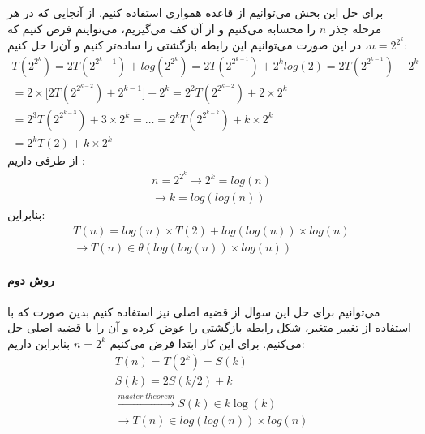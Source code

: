 \documentclass[]{article}
\begin{document}
برای حل این بخش می‌توانیم از قاعده همواری استفاده کنیم. از آنجایی که در هر مرحله جذر $n$
را محسابه می‌کنیم و از آن کف می‌گیریم، می‌تواینم فرض کنیم که $n = 2^{2^k}$،
در این صورت می‌توانیم این رابطه بازگشتی را ساده‌تر کنیم و آن‌را حل کنیم:
\begin{align}
    T(2^{2^k}) = 2T(2^{2^k-1}) + log(2^{2^k}) = 2T(2^{2^{k-1}}) + 2^k log(2) = 2T(2^{2^{k-1}}) + 2^k \\
    = 2 \times \lbrack 2T(2^{2^{k-2}}) + 2^{k-1}\rbrack + 2^k
    = 2^2T(2^{2^{k-2}}) + 2 \times 2^k \\
    = 2^3T(2^{2^{k-3}}) + 3 \times 2^k = \dots = 2^kT(2^{2^{k-k}}) + k \times 2^k \\
    = 2^k T(2) + k \times 2^k
\end{align}
از طرفی داریم :
\begin{align}
    n = 2^{2^k} \rightarrow 2^k = log(n) \\
    \rightarrow k = log(log(n))
\end{align}
بنابراین:
\begin{align}
    T(n) = log(n) \times T(2) + log(log(n)) \times log(n) \\
    \rightarrow T(n) \in \theta (log(log(n)) \times log(n))
\end{align}

\paragraph[2.3.2]{روش دوم}
می‌توانیم برای حل این سوال از قضیه اصلی نیز استفاده کنیم بدین صورت که با استفاده از تغییر متغیر،
شکل رابطه بازگشتی را عوض کرده و آن را با قضیه اصلی حل می‌کنیم. برای این کار ابتدا فرض می‌کنیم $n = 2^k$
بنابراین داریم:
\begin{align}
    T(n) = T(2^k) = S(k) \\
    S(k) = 2S(k/2) + k \\
    \xrightarrow{master\;theorem} S(k) \in k\log(k) \\
    \rightarrow T(n) \in log(log(n)) \times log(n)
\end{align}
\end{document}
